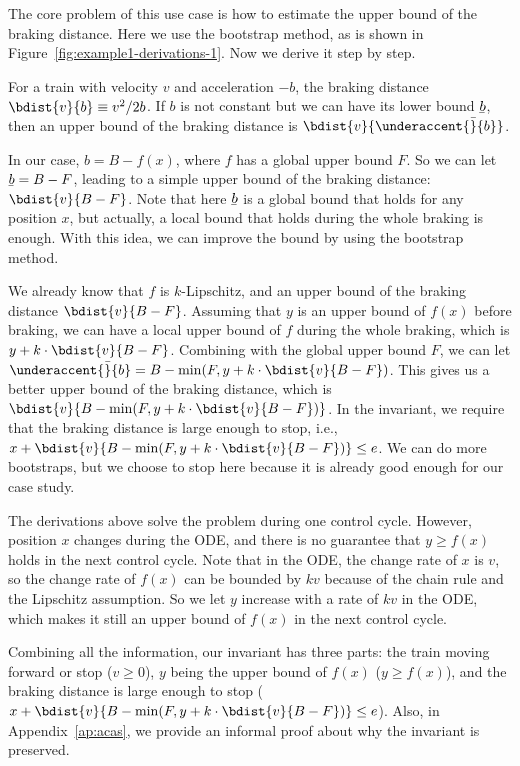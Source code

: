 The core problem of this use case is how to estimate the upper bound of the braking distance. Here we use the bootstrap method, as is shown in Figure~\ref{fig:example1-derivations-1}. Now we derive it step by step.

For a train with velocity $v$ and acceleration $-b$, the braking distance $\bdist{v}{b} \equiv v^2/2b$. If $b$ is not constant but we can have its lower bound $\underaccent{\bar}{b}$, then an upper bound of the braking distance is $\bdist{v}{\underaccent{\bar}{b}}$.

In our case, $b=B-f(x)$, where $f$ has a global upper bound $F$. So we can let $\underaccent{\bar}{b}=B-F$, leading to a simple upper bound of the braking distance: $\bdist{v}{B - F}$. Note that here $\underaccent{\bar}{b}$ is a global bound that holds for any position $x$, but actually, a local bound that holds during the whole braking is enough. With this idea, we can improve the bound by using the bootstrap method.

We already know that $f$ is $k$-Lipschitz, and an upper bound of the braking distance $\bdist{v}{B - F}$. Assuming that $y$ is an upper bound of $f(x)$ before braking, we can have a local upper bound of $f$ during the whole braking, which is $y + k \cdot \bdist{v}{B - F}$. Combining with the global upper bound $F$, we can let $\underaccent{\bar}{b}=B-\min(F, y + k \cdot \bdist{v}{B - F})$. This gives us a better upper bound of the braking distance, which is $\bdist{v}{B - \min(F, y + k \cdot \bdist{v}{B-F})}$. In the invariant, we require that the braking distance is large enough to stop, i.e., $x + \bdist{v}{B - \min(F, y + k \cdot \bdist{v}{B-F})} \le e$. We can do more bootstraps, but we choose to stop here because it is already good enough for our case study.

The derivations above solve the problem during one control cycle. However, position $x$ changes during the ODE, and there is no guarantee that $y \ge f(x)$ holds in the next control cycle. Note that in the ODE, the change rate of $x$ is $v$, so the change rate of $f(x)$ can be bounded by $kv$ because of the chain rule and the Lipschitz assumption. So we let $y$ increase with a rate of $kv$ in the ODE, which makes it still an upper bound of $f(x)$ in the next control cycle.

Combining all the information, our invariant has three parts: the train moving forward or stop ($v \ge 0$), $y$ being the upper bound of $f(x)$ ($y \ge f(x)$), and the braking distance is large enough to stop ($x + \bdist{v}{B - \min(F, y + k \cdot \bdist{v}{B-F})} \le e$). Also, in Appendix~\ref{ap:acas}, we provide an informal proof about why the invariant is preserved.


